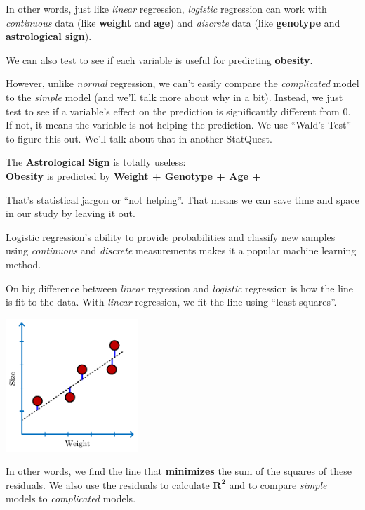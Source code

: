 \documentclass[
	final,
	a4paper,
	oneside,
	parskip=full,
	headings=standardclasses,
	headings=big,
	pointednumbers
]{scrartcl}
\newcommand{\tb}[1]{\textbf{#1}}
\newcommand{\ti}[1]{\textit{#1}}
\newcommand{\tcrossr}[1]{\tcrossc[#1][red]}
\begin{document}
    In other words, just like \ti{linear} regression, \ti{logistic} regression can work
    with \ti{continuous} data (like \tb{weight} and \tb{age}) and \ti{discrete} data
    (like \tb{genotype} and \tb{astrological sign}).

    We can also test to see if each variable is useful for predicting \tb{obesity}.

    However, unlike \ti{normal} regression, we can't easily compare the \ti{complicated}
    model to the \ti{simple} model (and we'll talk more about why in a bit).
    Instead, we just test to see if a variable's effect on the prediction is
    significantly different from 0. If not, it means the variable is not helping the
    prediction. We use ``Wald's Test'' to figure this out. We'll talk about that in another
    StatQuest.

    The \tb{Astrological Sign} is totally useless:\\
    \tb{Obesity} is predicted by \tb{Weight + Genotype + Age + \tcrossr{Astrological Sign}}

    That's statistical jargon or ``not helping''. That means we can save time and space
    in our study by leaving it out.

    Logistic regression's ability to provide probabilities and classify new samples using
    \ti{continuous} and \ti{discrete} measurements makes it a popular machine learning method.

    On big difference between \ti{linear} regression and \ti{logistic} regression is how the
    line is fit to the data. With \ti{linear} regression, we fit the line using ``least squares''.

    \begin{center}
        \includegraphics[height=5cm]{StatQuest_Logistic_Regression_Linear_Least_Squares.pdf}
    \end{center}

    In other words, we find the line that \tb{minimizes} the sum of the squares of
    these residuals. We also use the residuals to calculate $\bm{R^2}$ and to
    compare \ti{simple} models to \ti{complicated} models.
\end{document}

